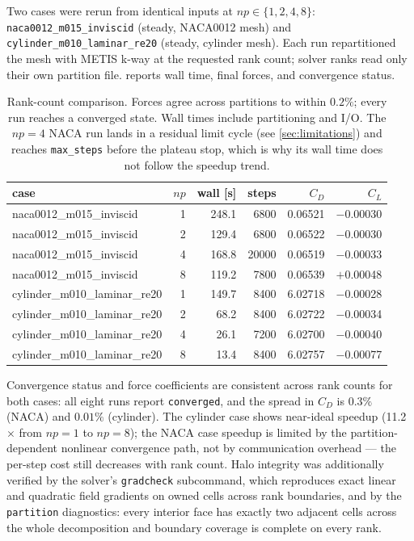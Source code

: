 Two cases were rerun from identical inputs at $np\in\{1,2,4,8\}$:
\texttt{naca0012\_m015\_inviscid} (steady, NACA0012 mesh) and
\texttt{cylinder\_m010\_laminar\_re20} (steady, cylinder mesh). Each run
repartitioned the mesh with METIS k-way at the requested rank count; solver
ranks read only their own partition file.  reports wall
time, final forces, and convergence status.

\begin{table}[ht]\centering\small
\caption{Rank-count comparison. Forces agree across partitions to within
$0.2\%$; every run reaches a converged state. Wall times include partitioning
and I/O. The $np=4$ NACA run lands in a residual limit cycle (see
\cref{sec:limitations}) and reaches \texttt{max\_steps} before the plateau
stop, which is why its wall time does not follow the speedup trend.}
\label{tab:rankstudy}
\begin{tabular}{lrrrrr}
\toprule
case & $np$ & wall [s] & steps & $C_D$ & $C_L$\\
\midrule
naca0012\_m015\_inviscid & 1 & 248.1 & 6800 & 0.06521 & $-$0.00030\\
naca0012\_m015\_inviscid & 2 & 129.4 & 6800 & 0.06522 & $-$0.00030\\
naca0012\_m015\_inviscid & 4 & 168.8 & 20000 & 0.06519 & $-$0.00033\\
naca0012\_m015\_inviscid & 8 & 119.2 & 7800 & 0.06539 & $+$0.00048\\
\midrule
cylinder\_m010\_laminar\_re20 & 1 & 149.7 & 8400 & 6.02718 & $-$0.00028\\
cylinder\_m010\_laminar\_re20 & 2 & 68.2 & 8400 & 6.02722 & $-$0.00034\\
cylinder\_m010\_laminar\_re20 & 4 & 26.1 & 7200 & 6.02700 & $-$0.00040\\
cylinder\_m010\_laminar\_re20 & 8 & 13.4 & 8400 & 6.02757 & $-$0.00077\\
\bottomrule
\end{tabular}
\end{table}

Convergence status and force coefficients are consistent across rank counts
for both cases: all eight runs report \texttt{converged}, and the spread in
$C_D$ is $0.3\%$ (NACA) and $0.01\%$ (cylinder). The cylinder case shows
near-ideal speedup (11.2$\times$ from $np{=}1$ to $np{=}8$); the NACA case
speedup is limited by the partition-dependent nonlinear convergence path,
not by communication overhead --- the per-step cost still decreases with
rank count. Halo integrity was additionally verified by the solver's
\texttt{gradcheck} subcommand, which reproduces exact linear and quadratic
field gradients on owned cells across rank boundaries, and by the
\texttt{partition} diagnostics: every interior face has exactly two adjacent
cells across the whole decomposition and boundary coverage is complete on
every rank.
